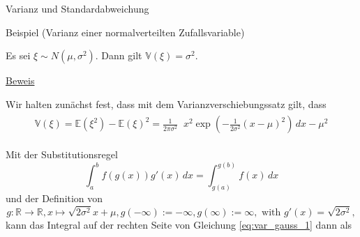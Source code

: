 \documentclass[
  8pt,
  ignorenonframetext,
]{beamer}
\DeclareMathOperator*{\intinf}{\int_{-\infty}^{\infty}}
\begin{document}
\begin{frame}{Varianz und Standardabweichung}
\protect\hypertarget{varianz-und-standardabweichung-3}{}
\small

Beispiel (Varianz einer normalverteilten Zufallsvariable) \vspace{1mm}

Es sei \(\xi \sim N(\mu,\sigma^2)\). Dann gilt
\(\mathbb{V}(\xi) = \sigma^2\). \vspace{3mm}

\footnotesize

\underline{Beweis} \vspace{1mm}

Wir halten zunächst fest, dass mit dem Varianzverschiebungssatz gilt,
dass \begin{align}\label{eq:var_gauss_1}
\begin{split}
\mathbb{V}(\xi)
= \mathbb{E}(\xi^2) - \mathbb{E}(\xi)^2
= \frac{1}{2\pi\sigma^2}\intinf x^2 \exp\left(-\frac{1}{2\sigma^2}(x-\mu)^2 \right)\,dx - \mu^2
\end{split}
\end{align}

Mit der Substitutionsregel \begin{equation}
\int_{a}^{b} f(g(x))g'(x)\,dx = \int_{g(a)}^{g(b)} f(x)\,dx
\end{equation} und der Definition von \begin{equation}
g:\mathbb{R} \to \mathbb{R}, x \mapsto \sqrt{2\sigma^2}x + \mu,
g(-\infty) := -\infty, g(\infty) := \infty,
\mbox{ with }
g'(x) = \sqrt{2\sigma^2},
\end{equation} kann das Integral auf der rechten Seite von Gleichung
\eqref{eq:var_gauss_1} dann als
\end{frame}
\end{document}
